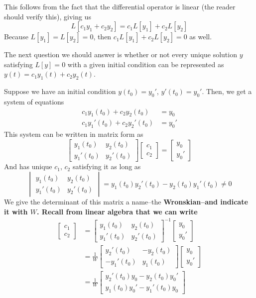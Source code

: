 This follows from the fact that the differential operator is linear (the reader should verify this), giving us
\[ L[c_1y_1 + c_2y_2] = c_1L[y_1] + c_2L[y_2] \]
Because $L[y_1] = L[y_2] = 0$, then $c_1L[y_1] + c_2L[y_2] = 0$ as well. \par
The next question we should answer is whether or not every unique solution $y$ satisfying $L[y] = 0$ with a given initial condition can be represented as $y(t) = c_1y_1(t) + c_2y_2(t)$. \par
Suppose we have an initial condition $y(t_0) = y_0'$, $y'(t_0) = y_0'$. Then, we get a system of equations
\begin{align*}
    c_1y_1(t_0) + c_2y_2(t_0) &= y_0 \\
    c_1y_1'(t_0) + c_2y_2'(t_0) &= y_0' 
\end{align*} 
This system can be written in matrix form as
\[ \begin{bmatrix}
    y_1(t_0) & y_2(t_0) \\
    y_1'(t_0) & y_2'(t_0)
\end{bmatrix}\begin{bmatrix}
    c_1 \\ c_2
\end{bmatrix} = \begin{bmatrix}
    y_0 \\ y_0'
\end{bmatrix}\]
And has unique $c_1$, $c_2$ satisfying it as long as 
\[ \begin{vmatrix}
    y_1(t_0) & y_2(t_0) \\
    y_1'(t_0) & y_2'(t_0)
\end{vmatrix} = y_1(t_0)y_2'(t_0) - y_2(t_0)y_1'(t_0) \neq 0 \]
We give the determinant of this matrix a name--the \bf{Wronskian}--and indicate it with $W$. Recall from linear algebra that we can write
\begin{align*}
    \begin{bmatrix}
        c_1 \\ c_2 
    \end{bmatrix} &= \begin{bmatrix}
        y_1(t_0) & y_2(t_0) \\
        y_1'(t_0) & y_2'(t_0)
    \end{bmatrix}^{-1} \begin{bmatrix}
        y_0 \\ y_0'
    \end{bmatrix} \\
    &= \frac{1}{W} \begin{bmatrix}
        y_2'(t_0) & -y_2(t_0) \\
        -y_1'(t_0) & y_1(t_0)
    \end{bmatrix}\begin{bmatrix}
        y_0 \\ y_0'
    \end{bmatrix} \\
    &= \frac{1}{W} \begin{bmatrix}
        y_2'(t_0)y_0 - y_2(t_0)y_0' \\
        y_1(t_0)y_0' - y_1'(t_0)y_0
    \end{bmatrix}
\end{align*}
